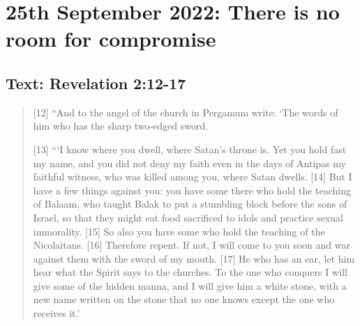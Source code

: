 \section{25th September 2022: There is no room for compromise}
\subsection*{Text: Revelation 2:12-17}
  \begin{quote}
    [12] “And to the angel of the church in Pergamum write: ‘The words of him
    who has the sharp two-edged sword.

    [13] “‘I know where you dwell, where Satan’s throne is.  Yet you hold
    fast my name, and you did not deny my faith even in the days of Antipas
    my faithful witness, who was killed among you, where Satan dwells.  [14]
    But I have a few things against you: you have some there who hold the
    teaching of Balaam, who taught Balak to put a stumbling block before the
    sons of Israel, so that they might eat food sacrificed to idols and
    practice sexual immorality.  [15] So also you have some who hold the
    teaching of the Nicolaitans.  [16] Therefore repent.  If not, I will come
    to you soon and war against them with the sword of my mouth.  [17] He who
    has an ear, let him hear what the Spirit says to the churches.  To the
    one who conquers I will give some of the hidden manna, and I will give
    him a white stone, with a new name written on the stone that no one knows
    except the one who receives it.’
  \end{quote}
